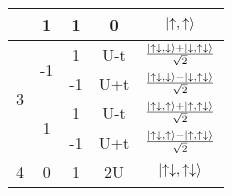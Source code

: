 \documentclass[12pt]{article}
\begin{document}
\begin{center}
\begin{tabular}{@{}ccccc@{}}
                                       & 1                   & 1  & 0   & \(\ket{\uparrow,\uparrow}\) \\ \toprule
\multirow{4}{*}{3}                     & \multirow{2}{*}{-1} & 1  & U-t & \(\frac{\ket{\uparrow\downarrow,\downarrow}+\ket{\downarrow,\uparrow\downarrow}}{\sqrt{2}}\) \\ \cmidrule(l){3-5} 
                                       &                     & -1 & U+t & \(\frac{\ket{\uparrow\downarrow,\downarrow}-\ket{\downarrow,\uparrow\downarrow}}{\sqrt{2}}\) \\ \cmidrule(l){2-5}
                                       & \multirow{2}{*}{1}  & 1  & U-t & \(\frac{\ket{\uparrow\downarrow,\uparrow}+\ket{\uparrow,\uparrow\downarrow}}{\sqrt{2}}\) \\ \cmidrule(l){3-5} 
                                       &                     & -1 & U+t & \(\frac{\ket{\uparrow\downarrow,\uparrow}-\ket{\uparrow,\uparrow\downarrow}}{\sqrt{2}}\) \\ \toprule
4                                      & 0                   & 1  & 2U  & \(\ket{\uparrow\downarrow,\uparrow\downarrow}\) \\
\toprule
\end{tabular}
\end{center}
\end{document}
